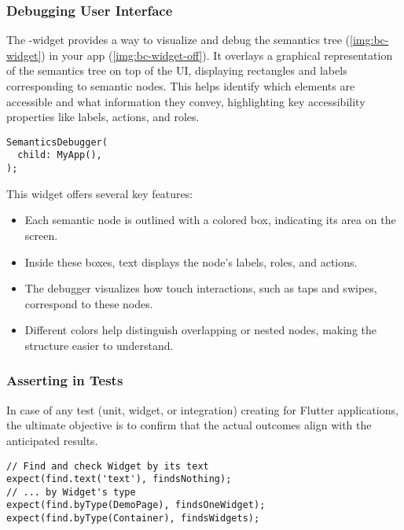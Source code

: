 \newpage
\subsubsection{Debugging User Interface}

The -widget provides a way to visualize and debug the semantics tree (\cref{img:bc-widget})
in your app (\cref{img:bc-widget-off}). It overlays a graphical representation of the semantics tree on top of the UI, 
displaying rectangles and labels corresponding to semantic nodes. This helps identify which elements are accessible and 
what information they convey, highlighting key accessibility properties like labels, actions, and roles.

\begin{lstlisting}
SemanticsDebugger(
  child: MyApp(),
);
\end{lstlisting}

\noindent This widget offers several key features:

\begin{itemize}
  \item Each semantic node is outlined with a colored box, indicating its area on the screen.
  \item Inside these boxes, text displays the node's labels, roles, and actions.
  \item The debugger visualizes how touch interactions, such as taps and swipes, correspond to these nodes.
  \item Different colors help distinguish overlapping or nested nodes, making the structure easier to understand.
\end{itemize}



\newpage
\subsubsection{Asserting in Tests}

In case of any test (unit, widget, or integration) creating for Flutter applications, the ultimate objective is to 
confirm that the actual outcomes align with the anticipated results.

\begin{lstlisting}
// Find and check Widget by its text
expect(find.text('text'), findsNothing);
// ... by Widget's type
expect(find.byType(DemoPage), findsOneWidget);
expect(find.byType(Container), findsWidgets);
\end{lstlisting}


